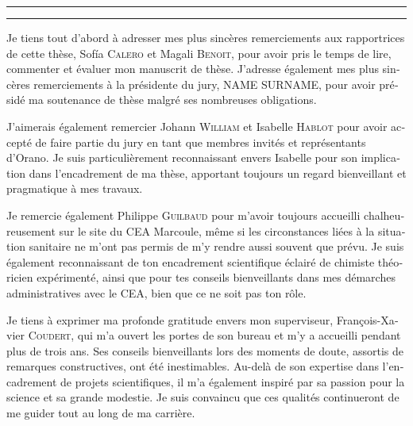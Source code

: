 \begin{otherlanguage}{french}

\hrule\relax
\vspace*{.9\baselineskip}%
\raggedright{\huge{}}\par%
\vspace*{1.1\baselineskip}%
\hrule\relax
\vspace*{\baselineskip}%
\thispagestyle{empty}

\begingroup
\itshape

Je tiens tout d'abord à adresser mes plus sincères remerciements aux rapportrices de cette thèse, Sof{\'{i}}a \textsc{Calero} et Magali \textsc{Benoit}, pour avoir pris le temps de lire, commenter et évaluer mon manuscrit de thèse. 
J'adresse également mes plus sincères remerciements à la présidente du jury, NAME \textsc{SURNAME}, pour avoir présidé ma soutenance de thèse malgré ses nombreuses obligations.

J'aimerais également remercier Johann \textsc{William} et Isabelle \textsc{Hablot} pour avoir accepté de faire partie du jury en tant que membres invités et représentants d'Orano. Je suis particulièrement reconnaissant envers Isabelle pour son implication dans l'encadrement de ma thèse, apportant toujours un regard bienveillant et pragmatique à mes travaux. 

Je remercie également Philippe \textsc{Guilbaud} pour m'avoir toujours accueilli chalheureusement sur le site du CEA Marcoule, même si les circonstances liées à la situation sanitaire ne m'ont pas permis de m'y rendre aussi souvent que prévu. Je suis également reconnaissant de ton encadrement scientifique éclairé de chimiste théoricien expérimenté, ainsi que pour tes conseils bienveillants dans mes démarches administratives avec le CEA, bien que ce ne soit pas ton rôle.

Je tiens à exprimer ma profonde gratitude envers mon superviseur, François-Xavier \textsc{Coudert}, qui m'a ouvert les portes de son bureau et m'y a accueilli pendant plus de trois ans. Ses conseils bienveillants lors des moments de doute, assortis de remarques constructives, ont été inestimables. Au-delà de son expertise dans l'encadrement de projets scientifiques, il m'a également inspiré par sa passion pour la science et sa grande modestie. Je suis convaincu que ces qualités continueront de me guider tout au long de ma carrière.


\end{otherlanguage}
